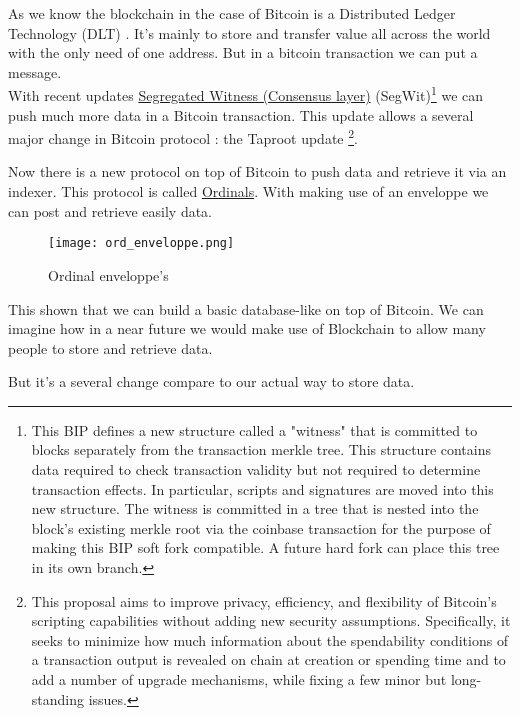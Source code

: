 \documentclass[12pt]{article}
\begin{document}
As we know the blockchain in the case of Bitcoin is a Distributed Ledger Technology (DLT) \cite{dlt}. It's mainly to store and transfer value all across the world with the only need of one address. But in a bitcoin transaction we can put a message. \\
With recent updates \href{https://github.com/bitcoin/bips/blob/master/bip-0141.mediawik}{Segregated Witness (Consensus layer)} (SegWit)\footnote{This BIP defines a new structure called a "witness" that is committed to blocks separately from the transaction merkle tree. This structure contains data required to check transaction validity but not required to determine transaction effects. In particular, scripts and signatures are moved into this new structure.
The witness is committed in a tree that is nested into the block's existing merkle root via the coinbase transaction for the purpose of making this BIP soft fork compatible. A future hard fork can place this tree in its own branch.
} we can push much more data in a Bitcoin transaction. This update allows a several major change in Bitcoin protocol : the Taproot update \cite{BIP341}\footnote{This proposal aims to improve privacy, efficiency, and flexibility of Bitcoin's scripting capabilities without adding new security assumptions. Specifically, it seeks to minimize how much information about the spendability conditions of a transaction output is revealed on chain at creation or spending time and to add a number of upgrade mechanisms, while fixing a few minor but long-standing issues.}.

Now there is a new protocol on top of Bitcoin to push data and retrieve it via an indexer. This protocol is called \href{https://docs.ordinals.com/}{Ordinals}.
With making use of an enveloppe we can post and retrieve easily data.

\begin{figure}[h!] 
\centering
\texttt{[image: ord\_enveloppe.png]}

\caption{Ordinal enveloppe's}
\end{figure}

This shown that we can build a basic database-like on top of Bitcoin. We can imagine how in a near future we would make use of Blockchain to allow many people to store and retrieve data. 

But it's a several change compare to our actual way to store data.












\newpage

 
\end{document}

